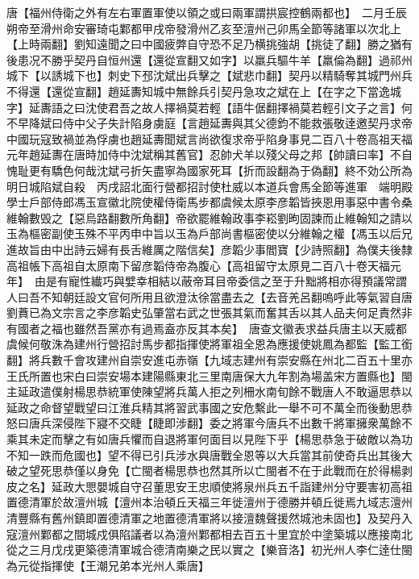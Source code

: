 唐【福州侍衛之外有左右軍置軍使以領之或曰兩軍謂拱宸控鶴兩都也】　二月壬辰朔帝至滑州命安審琦屯鄴都甲戌帝發滑州乙亥至澶州己卯馬全節等諸軍以次北上【上時兩翻】劉知遠聞之曰中國疲弊自守恐不足乃横挑強胡【挑徒了翻】勝之猶有後患况不勝乎契丹自恒州還【還從宣翻又如字】以羸兵驅牛羊【羸倫為翻】過祁州城下【以誘城下也】刺史下邳沈斌出兵擊之【斌悲巾翻】契丹以精騎奪其城門州兵不得還【還從宣翻】趙延夀知城中無餘兵引契丹急攻之斌在上【在字之下當逸城字】延夀語之曰沈使君吾之故人擇禍莫若輕【語牛倨翻擇禍莫若輕引文子之言】何不早降斌曰侍中父子失計陷身虜庭【言趙延夀與其父德鈞不能救張敬逹邀契丹求帝中國玩寇致禍並為俘虜也趙延夀聞斌言尚欲復求帝乎陷身事見二百八十卷高祖天福元年趙延夀在唐時加侍中沈斌稱其舊官】忍帥犬羊以殘父母之邦【帥讀曰率】不自愧耻更有驕色何哉沈斌弓折矢盡寧為國家死耳【折而設翻為于偽翻】終不効公所為明日城陷斌自殺　丙戌詔北面行營都招討使杜威以本道兵會馬全節等進軍　端明殿學士戶部侍郎馮玉宣徽北院使權侍衛馬步都虞候太原李彦韜皆挾恩用事惡中書令桑維翰數毁之【惡烏路翻數所角翻】帝欲罷維翰政事李崧劉昫固諫而止維翰知之請以玉為樞密副使玉殊不平丙申中旨以玉為戶部尚書樞密使以分維翰之權【馮玉以后兄進故旨由中出詩云婦有長舌維厲之階信矣】彦韜少事閻寶【少詩照翻】為僕夫後隸高祖帳下高祖自太原南下留彦韜侍帝為腹心【高祖留守太原見二百八十卷天福元年】　由是有寵性纎巧與嬖幸相結以蔽帝耳目帝委信之至于升黜將相亦得預議常謂人曰吾不知朝廷設文官何所用且欲澄汰徐當盡去之【去音羌呂翻嗚呼此等氣習自唐劉蕡已為文宗言之李彦韜史弘肇當右武之世張其氣而奮其舌以其人品夫何足責然非有國者之福也雖然吾黨亦有過焉盍亦反其本矣】　唐查文徽表求益兵唐主以天威都虞候何敬洙為建州行營招討馬步都指揮使將軍祖全恩為應援使姚鳳為都監【監工銜翻】將兵數千會攻建州自崇安進屯赤嶺【九域志建州有崇安縣在州北二百五十里亦王氏所置也宋白曰崇安場本建陽縣東北三里南唐保大九年割為場盖宋方置縣也】閩主延政遣僕射楊思恭統軍使陳望將兵萬人拒之列柵水南旬餘不戰唐人不敢逼思恭以延政之命督望戰望曰江淮兵精其將習武事國之安危繫此一舉不可不萬全而後動思恭怒曰唐兵深侵陛下寢不交睫【睫即涉翻】委之將軍今唐兵不出數千將軍擁衆萬餘不乘其未定而擊之有如唐兵懼而自退將軍何面目以見陛下乎【楊思恭急于破敵以為功不知一跌而危國也】望不得已引兵涉水與唐戰全恩等以大兵當其前使奇兵出其後大破之望死思恭僅以身免【亡閩者楊思恭也然其所以亡閩者不在于此戰而在於得楊剥皮之名】延政大愳嬰城自守召董思安王忠順使將泉州兵五千詣建州分守要害初高祖置德清軍於故澶州城【澶州本治頓丘天福三年徙澶州于德勝并頓丘徙焉九域志澶州清豐縣有舊州鎮即置德清軍之地置德清軍將以接澶魏聲援然城池未固也】及契丹入寇澶州鄴都之間城戍俱陷議者以為澶州鄴都相去百五十里宜於中塗築城以應接南北從之三月戊戌更築德清軍城合德清南樂之民以實之【樂音洛】初光州人李仁逹仕閩為元從指揮使【王潮兄弟本光州人乘唐】

